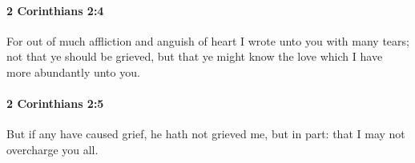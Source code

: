 		\paragraph{2 Corinthians 2:4} %
			\label{2CORINTHIANS-2-4}

			For out of much affliction and anguish of heart I wrote unto you with many tears; not that ye should be grieved, but that ye might know the love which I have more abundantly unto you.

			\begin{framed}
			\scriptsize
				\begin{compactdesc}
					\item[SBLG] 
				\end{compactdesc}
			\end{framed}

		\paragraph{2 Corinthians 2:5} %
			\label{2CORINTHIANS-2-5}

			But if any have caused grief, he hath not grieved me, but in part: that I may not overcharge you all.

